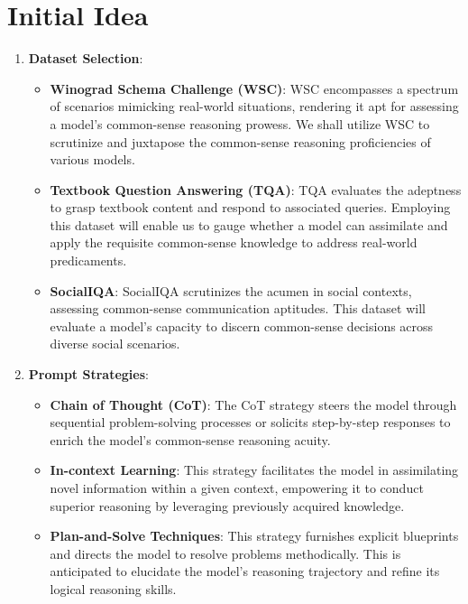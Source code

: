 \documentclass[fleqn,moreauthors,10pt]{ds_report}
\begin{document}


\section*{Initial Idea}

\begin{enumerate}
    \item \textbf{Dataset Selection}:
    \begin{itemize}
        \item \textbf{Winograd Schema Challenge (WSC)}: WSC encompasses a spectrum of scenarios mimicking real-world situations, rendering it apt for assessing a model's common-sense reasoning prowess. We shall utilize WSC to scrutinize and juxtapose the common-sense reasoning proficiencies of various models.
        \item \textbf{Textbook Question Answering (TQA)}: TQA evaluates the adeptness to grasp textbook content and respond to associated queries. Employing this dataset will enable us to gauge whether a model can assimilate and apply the requisite common-sense knowledge to address real-world predicaments.
        \item \textbf{SocialIQA}: SocialIQA scrutinizes the acumen in social contexts, assessing common-sense communication aptitudes. This dataset will evaluate a model's capacity to discern common-sense decisions across diverse social scenarios.
    \end{itemize}
    
    \item \textbf{Prompt Strategies}:
    \begin{itemize}
        \item \textbf{Chain of Thought (CoT)}: The CoT strategy steers the model through sequential problem-solving processes or solicits step-by-step responses to enrich the model's common-sense reasoning acuity.
        \item \textbf{In-context Learning}: This strategy facilitates the model in assimilating novel information within a given context, empowering it to conduct superior reasoning by leveraging previously acquired knowledge.
        \item \textbf{Plan-and-Solve Techniques}: This strategy furnishes explicit blueprints and directs the model to resolve problems methodically. This is anticipated to elucidate the model's reasoning trajectory and refine its logical reasoning skills.
    \end{itemize}
    

\end{enumerate}
\end{document}
